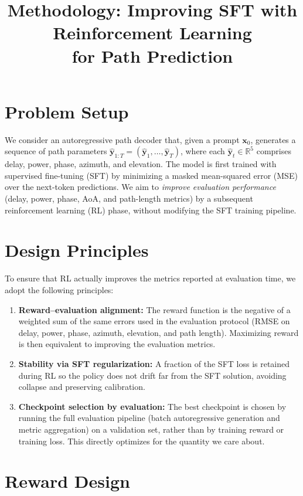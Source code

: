 \documentclass[11pt,a4paper]{article}
\title{Methodology: Improving SFT with Reinforcement Learning\\for Path Prediction}
\author{}
\date{}
\begin{document}
\maketitle

\section{Problem Setup}

We consider an autoregressive path decoder that, given a prompt $\bm{x}_0$, generates a sequence of path parameters $\hat{\bm{y}}_{1:T} = (\hat{\bm{y}}_1, \ldots, \hat{\bm{y}}_T)$, where each $\hat{\bm{y}}_t \in \mathbb{R}^5$ comprises delay, power, phase, azimuth, and elevation. The model is first trained with supervised fine-tuning (SFT) by minimizing a masked mean-squared error (MSE) over the next-token predictions. We aim to \emph{improve evaluation performance} (delay, power, phase, AoA, and path-length metrics) by a subsequent reinforcement learning (RL) phase, without modifying the SFT training pipeline.

\section{Design Principles}

To ensure that RL actually improves the metrics reported at evaluation time, we adopt the following principles:

\begin{enumerate}
  \item \textbf{Reward--evaluation alignment:} The reward function is the negative of a weighted sum of the same errors used in the evaluation protocol (RMSE on delay, power, phase, azimuth, elevation, and path length). Maximizing reward is then equivalent to improving the evaluation metrics.
  \item \textbf{Stability via SFT regularization:} A fraction of the SFT loss is retained during RL so the policy does not drift far from the SFT solution, avoiding collapse and preserving calibration.
  \item \textbf{Checkpoint selection by evaluation:} The best checkpoint is chosen by running the full evaluation pipeline (batch autoregressive generation and metric aggregation) on a validation set, rather than by training reward or training loss. This directly optimizes for the quantity we care about.
\end{enumerate}

\section{Reward Design}
\end{document}
